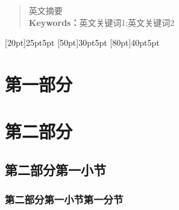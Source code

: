 \documentclass[12pt]{article}
\begin{document}
\begin{abstract}
     英文摘要 \\
     \textbf{\heiti Keywords：}英文关键词1;英文关键词2
\end{abstract}
\newpage
\tableofcontents
\contentsmargin{0pt}
\renewcommand\contentspage{\thecontentspage}
[20pt]{\vspace{1mm}\bfseries\songti{}}{25pt}{5pt}
[50pt]{\vspace{1mm}\songti{}}{30pt}{5pt}
[80pt]{\vspace{1mm}\songti{}}{40pt}{5pt}
\newpage
{}
\section{\songti{}第一部分}
\section{\songti{}第二部分}
\subsection{\songti{}第二部分第一小节}
\subsubsection{\songti{}第二部分第一小节第一分节}
\end{document}
